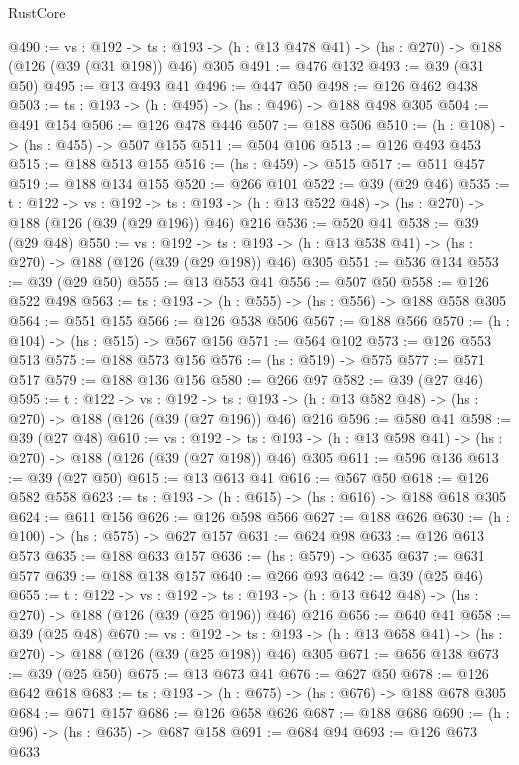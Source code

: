\begin{lexlean}{RustCore}
\begin{coremodule}
@490 := {vs : @192} ->
  {ts : @193} -> (h : @13 @478 @41) -> (hs : @270) -> @188 (@126 (@39 (@31 @198)) @46) @305
@491 := @476 @132
@493 := @39 (@31 @50)
@495 := @13 @493 @41
@496 := @447 @50
@498 := @126 @462 @438
@503 := {ts : @193} -> (h : @495) -> (hs : @496) -> @188 @498 @305
@504 := @491 @154
@506 := @126 @478 @446
@507 := @188 @506
@510 := (h : @108) -> (hs : @455) -> @507 @155
@511 := @504 @106
@513 := @126 @493 @453
@515 := @188 @513 @155
@516 := (hs : @459) -> @515
@517 := @511 @457
@519 := @188 @134 @155
@520 := @266 @101
@522 := @39 (@29 @46)
@535 := {t : @122} ->
  {vs : @192} ->
  {ts : @193} -> (h : @13 @522 @48) -> (hs : @270) -> @188 (@126 (@39 (@29 @196)) @46) @216
@536 := @520 @41
@538 := @39 (@29 @48)
@550 := {vs : @192} ->
  {ts : @193} -> (h : @13 @538 @41) -> (hs : @270) -> @188 (@126 (@39 (@29 @198)) @46) @305
@551 := @536 @134
@553 := @39 (@29 @50)
@555 := @13 @553 @41
@556 := @507 @50
@558 := @126 @522 @498
@563 := {ts : @193} -> (h : @555) -> (hs : @556) -> @188 @558 @305
@564 := @551 @155
@566 := @126 @538 @506
@567 := @188 @566
@570 := (h : @104) -> (hs : @515) -> @567 @156
@571 := @564 @102
@573 := @126 @553 @513
@575 := @188 @573 @156
@576 := (hs : @519) -> @575
@577 := @571 @517
@579 := @188 @136 @156
@580 := @266 @97
@582 := @39 (@27 @46)
@595 := {t : @122} ->
  {vs : @192} ->
  {ts : @193} -> (h : @13 @582 @48) -> (hs : @270) -> @188 (@126 (@39 (@27 @196)) @46) @216
@596 := @580 @41
@598 := @39 (@27 @48)
@610 := {vs : @192} ->
  {ts : @193} -> (h : @13 @598 @41) -> (hs : @270) -> @188 (@126 (@39 (@27 @198)) @46) @305
@611 := @596 @136
@613 := @39 (@27 @50)
@615 := @13 @613 @41
@616 := @567 @50
@618 := @126 @582 @558
@623 := {ts : @193} -> (h : @615) -> (hs : @616) -> @188 @618 @305
@624 := @611 @156
@626 := @126 @598 @566
@627 := @188 @626
@630 := (h : @100) -> (hs : @575) -> @627 @157
@631 := @624 @98
@633 := @126 @613 @573
@635 := @188 @633 @157
@636 := (hs : @579) -> @635
@637 := @631 @577
@639 := @188 @138 @157
@640 := @266 @93
@642 := @39 (@25 @46)
@655 := {t : @122} ->
  {vs : @192} ->
  {ts : @193} -> (h : @13 @642 @48) -> (hs : @270) -> @188 (@126 (@39 (@25 @196)) @46) @216
@656 := @640 @41
@658 := @39 (@25 @48)
@670 := {vs : @192} ->
  {ts : @193} -> (h : @13 @658 @41) -> (hs : @270) -> @188 (@126 (@39 (@25 @198)) @46) @305
@671 := @656 @138
@673 := @39 (@25 @50)
@675 := @13 @673 @41
@676 := @627 @50
@678 := @126 @642 @618
@683 := {ts : @193} -> (h : @675) -> (hs : @676) -> @188 @678 @305
@684 := @671 @157
@686 := @126 @658 @626
@687 := @188 @686
@690 := (h : @96) -> (hs : @635) -> @687 @158
@691 := @684 @94
@693 := @126 @673 @633

\end{coremodule}
\end{lexlean}
